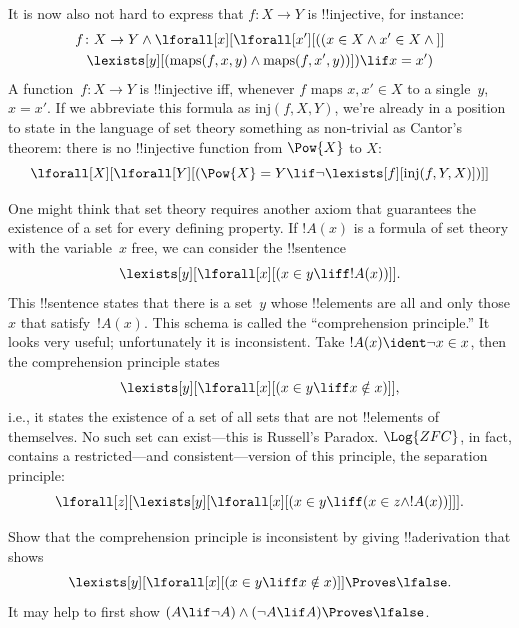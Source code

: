 \documentclass[../../../include/open-logic-section]{subfiles}
\begin{document}
It is now also not hard to express that $f\colon X \to Y$ is
!!{injective}, for instance:
\begin{multline*}
 f \colon X \to Y \land \lforall[x][\lforall[x'][((x \in X \land x' \in
     X \land {}]] \\
 \lexists[y][(\mathrm{maps}(f, x, y) \land \mathrm{maps}(f,
        x', y))]) \lif x = x')
\end{multline*}
A function~$f\colon X \to Y$ is !!{injective} iff, whenever $f$ maps $x, x'
\in X$ to a single~$y$, $x = x'$.  If we abbreviate this formula as
$\mathrm{inj}(f, X, Y)$, we're already in a position to state in the
language of set theory something as non-trivial as Cantor's theorem:
there is no !!{injective} function from $\Pow{X}$ to $X$:
\[
\lforall[X][\lforall[Y][(\Pow{X} = Y \lif
    \lnot\lexists[f][\mathrm{inj}(f, Y, X)])]]
\]

One might think that set theory requires another axiom that guarantees
the existence of a set for every defining property. If $!A(x)$ is a
formula of set theory with the variable~$x$ free, we can consider the
!!{sentence}
\[
\lexists[y][\lforall[x][(x \in y \liff !A(x))]].
\]
This !!{sentence} states that there is a set~$y$ whose !!{element}s
are all and only those $x$ that satisfy~$!A(x)$. This schema is called
the ``comprehension principle.''  It looks very useful; unfortunately
it is inconsistent.  Take $!A(x) \ident \lnot x \in x$, then the
comprehension principle states
\[
\lexists[y][\lforall[x][(x \in y \liff x \notin x)]],
\]
i.e., it states the existence of a set of all sets that are not
!!{element}s of themselves. No such set can exist---this is Russell's
Paradox.  $\Log{ZFC}$, in fact, contains a restricted---and
consistent---version of this principle, the separation principle:
\[
\lforall[z][\lexists[y][\lforall[x][(x \in y \liff (x \in z \land
      !A(x))]]].
\]

\begin{prob}
Show that the comprehension principle is inconsistent by giving
!!a{derivation} that shows
\[
\lexists[y][\lforall[x][(x \in y \liff x \notin x)]] \Proves \lfalse.
\]
It may help to first show $(A \lif \lnot A) \land (\lnot A \lif A)
\Proves \lfalse$.
\end{prob}
\end{document}
